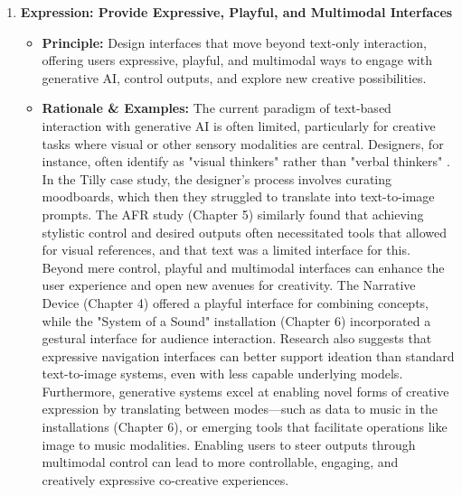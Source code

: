 \begin{enumerate}[label=\arabic*., wide, labelindent=0pt]
\item \textbf{Expression: Provide Expressive, Playful, and Multimodal Interfaces}
    \begin{itemize}[label=\textbullet, leftmargin=*]
        \item \textbf{Principle:} Design interfaces that move beyond text-only interaction, offering users expressive, playful, and multimodal ways to engage with generative AI, control outputs, and explore new creative possibilities.
        \item \textbf{Rationale \& Examples:} The current paradigm of text-based interaction with generative AI is often limited, particularly for creative tasks where visual or other sensory modalities are central. Designers, for instance, often identify as "visual thinkers" rather than "verbal thinkers" \cite{Park2024-gw}. In the Tilly case study, the designer's process involves curating moodboards, which then they struggled to translate into text-to-image prompts. The AFR study (Chapter 5) similarly found that achieving stylistic control and desired outputs often necessitated tools that allowed for visual references, and that text was a limited interface for this. Beyond mere control, playful and multimodal interfaces can enhance the user experience and open new avenues for creativity. The Narrative Device (Chapter 4) offered a playful interface for combining concepts, while the "System of a Sound" installation (Chapter 6) incorporated a gestural interface for audience interaction. Research also suggests that expressive navigation interfaces can better support ideation than standard text-to-image systems, even with less capable underlying models. Furthermore, generative systems excel at enabling novel forms of creative expression by translating between modes—such as data to music in the installations (Chapter 6), or emerging tools that facilitate operations like image to music modalities. Enabling users to steer outputs through multimodal control can lead to more controllable, engaging, and creatively expressive co-creative experiences.
    \end{itemize}


\end{enumerate}
